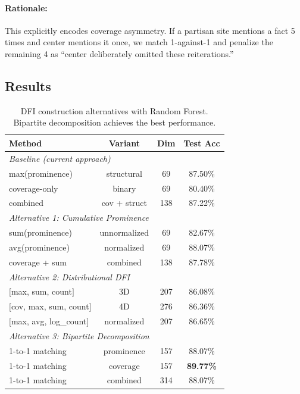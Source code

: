 \documentclass[12pt,a4paper]{article}
\begin{document}
\paragraph{Rationale:} This explicitly encodes coverage asymmetry. If a partisan site mentions
a fact 5 times and center mentions it once, we match 1-against-1 and penalize the remaining
4 as ``center deliberately omitted these reiterations.''

\subsection{Results}

\begin{table}[h]
\centering
\small
\begin{tabular}{lccc}
\hline
\textbf{Method} & \textbf{Variant} & \textbf{Dim} & \textbf{Test Acc} \\
\hline
\multicolumn{4}{l}{\textit{Baseline (current approach)}} \\
max(prominence) & structural & 69 & 87.50\% \\
coverage-only & binary & 69 & 80.40\% \\
combined & cov + struct & 138 & 87.22\% \\
\midrule
\multicolumn{4}{l}{\textit{Alternative 1: Cumulative Prominence}} \\
sum(prominence) & unnormalized & 69 & 82.67\% \\
avg(prominence) & normalized & 69 & 88.07\% \\
coverage + sum & combined & 138 & 87.78\% \\
\midrule
\multicolumn{4}{l}{\textit{Alternative 2: Distributional DFI}} \\
$[$max, sum, count$]$ & 3D & 207 & 86.08\% \\
$[$cov, max, sum, count$]$ & 4D & 276 & 86.36\% \\
$[$max, avg, log\_count$]$ & normalized & 207 & 86.65\% \\
\midrule
\multicolumn{4}{l}{\textit{Alternative 3: Bipartite Decomposition}} \\
1-to-1 matching & prominence & 157 & 88.07\% \\
1-to-1 matching & coverage & 157 & \textbf{89.77\%} \\
1-to-1 matching & combined & 314 & 88.07\% \\
\hline
\end{tabular}
\caption{DFI construction alternatives with Random Forest. Bipartite decomposition achieves
the best performance.}
\label{tab:dfi_alternatives}
\end{table}
\end{document}
